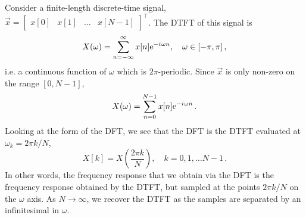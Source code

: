 Consider a finite-length discrete-time signal,
$\vec{x} = \left[\begin{array}{cccc}x[0] & x[1] & \hdots & x[N-1]\end{array}\right]^\top$.
The DTFT of this signal is
%
\begin{displaymath}
  X(\omega) = \sum_{n=-\infty}^\infty x[n]\mathrm{e}^{-{i\mkern1mu}\omega n}, \quad \omega\in[-\pi,\pi] \,,
\end{displaymath}
%
i.e. a continuous function of $\omega$ which is $2\pi$-periodic. Since $\vec{x}$ is
only non-zero on the range $[0,N-1]$,
%
\begin{displaymath}
  X(\omega) = \sum_{n=0}^{N-1}x[n]\mathrm{e}^{-{i\mkern1mu}\omega n} \,.
\end{displaymath}
%
Looking at the form of the DFT, we see that the DFT is the DTFT evaluated at
$\omega_k = 2\pi k/N$,
%
\begin{displaymath}
  X[k] = X\left(\frac{2\pi k}{N}\right), \quad k = 0, 1, \hdots N-1 \,.
\end{displaymath}
%
In other words, the frequency response that we obtain via the DFT is the frequency
response obtained by the DTFT, but sampled at the points $2\pi k / N$ on the
$\omega$ axis. As $N\rightarrow\infty$, we recover the DTFT as the samples are separated
by an infinitesimal in $\omega$.
%
